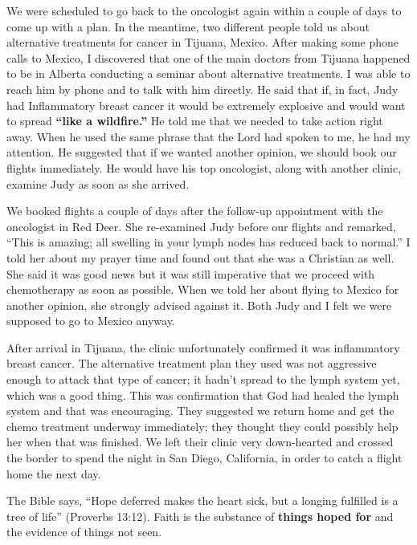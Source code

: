 \documentclass[twoside, 12pt]{book}
\begin{document}
We were scheduled to go back to the oncologist again within a couple of days to come up with a plan. In the meantime, two different people told us about alternative treatments for cancer in Tijuana, Mexico. After making some phone calls to Mexico, I discovered that one of the main doctors from Tijuana happened to be in Alberta conducting a seminar about alternative treatments. I was able to reach him by phone and to talk with him directly. He said that if, in fact, Judy had Inflammatory breast cancer it would be extremely explosive and would want to spread \textbf{“like a wildfire.”} He told me that we needed to take action right away. When he used the same phrase that the Lord had spoken to me, he had my attention. He suggested that if we wanted another opinion, we should book our flights immediately. He would have his top oncologist, along with another clinic, examine Judy as soon as she arrived. 

We booked flights a couple of days after the follow-up appointment with the oncologist in Red Deer. She re-examined Judy before our flights and remarked, “This is amazing; all swelling in your lymph nodes has reduced back to normal.” I told her about my prayer time and found out that she was a Christian as well. She said it was good news but it was still imperative that we proceed with chemotherapy as soon as possible. When we told her about flying to Mexico for another opinion, she strongly advised against it.  Both Judy and I felt we were supposed to go to Mexico anyway.

After arrival in Tijuana, the clinic unfortunately confirmed it was inflammatory breast cancer. The alternative treatment plan they used was not aggressive enough to attack that type of cancer; it hadn’t spread to the lymph system yet, which was a good thing. This was confirmation that God had healed the lymph system and that was encouraging. They suggested we return home and get the chemo treatment underway immediately; they thought they could possibly help her when that was finished. We left their clinic very down-hearted and crossed the border to spend the night in San Diego, California, in order to catch a flight home the next day. 

The Bible says, “Hope deferred makes the heart sick, but a longing fulfilled is a tree of life” (Proverbs 13:12). Faith is the substance of \textbf{things hoped for} and the evidence of things not seen. 
\end{document}
